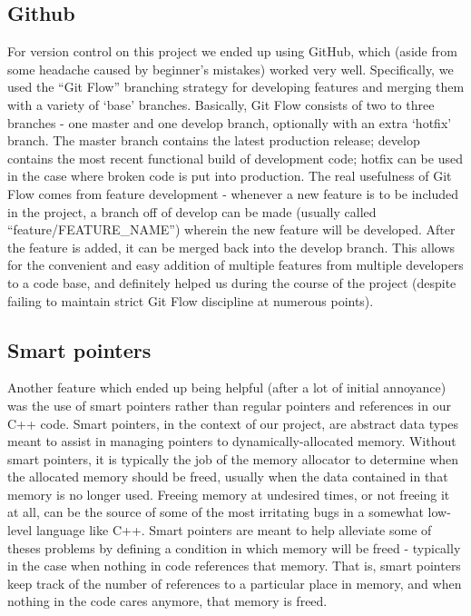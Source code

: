 \documentclass[12pt]{article}
\begin{document}
\subsection*{Github}

For version control on this project we ended up using GitHub, which (aside from some headache caused by beginner’s
mistakes) worked very well. Specifically, we used the “Git Flow” branching strategy for developing features and merging 
them with a variety of ‘base’ branches. Basically, Git Flow consists of two to three branches - one master and one 
develop branch, optionally with an extra ‘hotfix’ branch. The master branch contains the latest production release; 
develop contains the most recent functional build of development code; hotfix can be used in the case where broken 
code is put into production. The real usefulness of Git Flow comes from feature development - whenever a new feature is 
to be included in the project, a branch off of develop can be made (usually called ``feature/FEATURE\_NAME'') wherein 
the new feature will be developed. After the feature is added, it can be merged back into the develop branch. This allows for the convenient and easy addition of multiple features from multiple developers to a code base, and definitely helped us during the course of the project (despite failing to maintain strict Git Flow discipline at numerous points).


\subsection*{Smart pointers}

Another feature which ended up being helpful (after a lot of initial annoyance) was the use of smart pointers rather than regular pointers and references in our C++ code. Smart pointers, in the context of our project, are abstract data types meant to assist in managing pointers to dynamically-allocated memory. Without smart pointers, it is typically the job of the memory allocator to determine when the allocated memory should be freed, usually when the data contained in that memory is no longer used. Freeing memory at undesired times, or not freeing it at all, can be the source of some of the most irritating bugs in a somewhat low-level language like C++. Smart pointers are meant to help alleviate some of theses problems by defining a condition in which memory will be freed - typically in the case when nothing in code references that memory. That is, smart pointers keep track of the number of references to a particular place in memory, and when nothing in the code cares anymore, that memory is freed.
\end{document}
